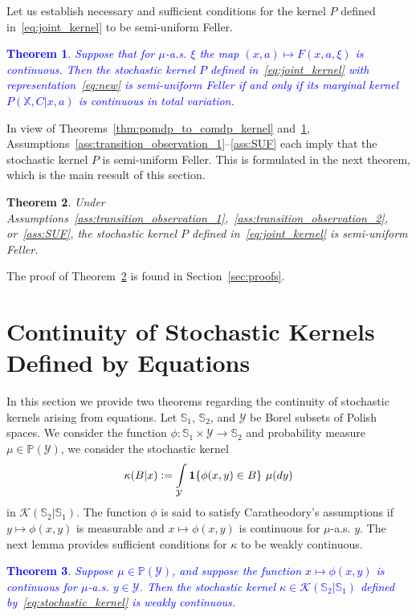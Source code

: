 \documentclass[11pt,onecolumn]{IEEEtran}  %
\newcommand{\Pb}{\mathbb{P}}
\newcommand{\Sb}{\mathbb{S}}
\newcommand{\Xb}{\mathbb{X}}
\newcommand{\Kc}{\mathcal{K}}
\newcommand{\Yc}{\mathcal{Y}}
\newcommand{\one}[1]{\mathbf{1}\set{#1}}
\newcommand{\defeq}{:=}%
\DeclarePairedDelimiter{\set}{\{}{\}}
\newtheorem{theorem}{Theorem}
\theoremstyle{definition}
\begin{document}
Let us establish necessary and sufficient conditions for the kernel $P$ defined in~\eqref{eq:joint_kernel} to be semi-uniform Feller.
\textcolor{blue}{
\begin{theorem}\label{thm:new}
    Suppose that for $\mu$-a.s. $\xi$ the map $(x,a) \mapsto F(x,a,\xi)$ is continuous. Then the stochastic kernel $P$ defined in~\eqref{eq:joint_kernel} with representation~\eqref{eq:new} is semi-uniform Feller if and only if  its marginal kernel $P(\Xb , C|x,a)$
    is continuous in total variation.
\end{theorem}}


In view of Theorems~\ref{thm:pomdp_to_comdp_kernel} and~\ref{thm:new}, Assumptions~\ref{ass:transition_observation_1}--\ref{ass:SUF} each imply that the stochastic kernel $P$ is semi-uniform Feller. This is formulated in the next theorem, which is the main reesult of this section.


\begin{theorem} \label{thm:main_result_P}
    Under Assumptions~\ref{ass:transition_observation_1},~\ref{ass:transition_observation_2}, or~\ref{ass:SUF}, the stochastic kernel $P$ defined in~\eqref{eq:joint_kernel} is semi-uniform Feller.
\end{theorem}

The proof of Theorem~\ref{thm:main_result_P} is found in Section~\ref{sec:proofs}.

\section{Continuity of Stochastic Kernels Defined by Equations} \label{sec:conditions}

In this section we provide two theorems regarding the continuity of stochastic kernels arising from equations.  Let $\Sb_1$, $\Sb_2$, and $\Yc$ be Borel subsets of Polish spaces. We consider the function $\phi : \Sb_1 \times \Yc \to \Sb_2$ and probability measure $\mu \in \Pb(\Yc)$, we consider the stochastic kernel
\begin{equation} \label{eq:stochastic_kernel}
    \kappa(B|x) \defeq \int\limits_{\Yc} \one{\phi(x,y) \in B} \ \mu(dy)
\end{equation}
in $\Kc(\Sb_2|\Sb_1)$. The function $\phi$ is said to satisfy Caratheodory's assumptions if $y \mapsto \phi(x,y)$ is measurable and $x \mapsto \phi(x,y)$ is  continuous for $\mu$-a.s. $y$. The next lemma provides sufficient conditions for $\kappa$ to be weakly continuous.

\textcolor{blue}{
\begin{theorem} \label{lem:weak_continuous}
    Suppose $\mu \in \Pb(\Yc)$, and suppose the function $x \mapsto \phi(x,y)$ is continuous for $\mu$-a.s. $y \in \Yc$. Then the stochastic kernel $\kappa \in \Kc(\Sb_2|\Sb_1)$ defined by~\eqref{eq:stochastic_kernel} is weakly continuous.
\end{theorem}}
\end{document}

